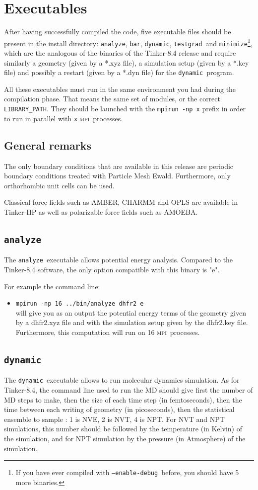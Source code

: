 \documentclass[peerreview]{IEEEtran}
\def\mpi{\textsc{mpi}}
\def\enadeb{\texttt{--enable-debug}}
\def\analyze{\texttt{analyze}}
\def\bar{\texttt{bar}}
\def\dynamic{\texttt{dynamic}}
\def\minimize{\texttt{minimize}}
\def\testgrad{\texttt{testgrad}}
\def\mpirun{\texttt{mpirun -np}}
\begin{document}
\section{Executables}
After having successfully compiled the code, five executable files should be present in the install directory: \analyze, \bar, \dynamic, \testgrad\ and \minimize\footnote{If you have ever compiled with \enadeb\ before, you should  have 5 more binaries.}, which are the analogous of the binaries of the Tinker-8.4 release and require similarly a geometry (given by a *.xyz file), a simulation setup (given by a *.key file) and possibly a restart (given by a *.dyn file) for the \dynamic\ program. 

All these executables must run in the same environment you had during the compilation phase. That means the same set of modules, or the correct \texttt{LIBRARY\_PATH}. They should be launched with the \mpirun\texttt{ x} prefix in order to run in parallel with \texttt{x} \mpi\  processes. 

\subsection{General remarks}
The only boundary conditions that are available in this release are periodic boundary conditions treated with Particle Mesh Ewald. Furthermore, only orthorhombic unit cells can be used.


Classical force fields such as AMBER, CHARMM and OPLS are available in Tinker-HP as well as polarizable force fields such as AMOEBA.
\subsection{\analyze\ } 
The \analyze\ executable allows potential energy analysis. Compared to the Tinker-8.4 software, the only option compatible with this binary is "e".

For example the command line: 
\begin{itemize}
\item[] \mpirun\texttt{ 16 ../bin/analyze dhfr2 e} \\
will give you as an output the potential energy terms of the geometry given by a dhfr2.xyz file and with the simulation setup given by the dhfr2.key file. Furthermore, this computation will run on 16 \mpi\  processes.
\end{itemize}
\subsection{\dynamic\ }
The \dynamic\ executable allows to run molecular dynamics simulation. As for Tinker-8.4, the command line used to run the MD should give first the number of MD steps to make, then the size of each time step (in femtoseconds), then the time between each writing of geometry (in picoseconds), then the statistical ensemble to sample : 1 is NVE, 2 is NVT, 4 is NPT. For NVT and NPT simulations, this number should be followed by the temperature (in Kelvin) of the simulation, and for NPT simulation by the pressure (in Atmosphere) of the simulation.
\end{document}
